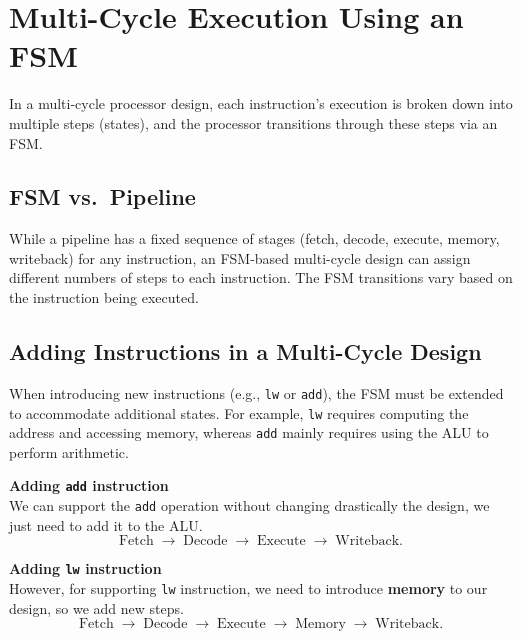 \section{Multi-Cycle Execution Using an FSM}
In a multi-cycle processor design, each instruction's execution is broken down into multiple steps (states), and the processor transitions through these steps via an FSM.

\subsection{FSM vs.\ Pipeline}
While a pipeline has a fixed sequence of stages (fetch, decode, execute, memory, writeback) for any instruction, an FSM-based multi-cycle design can assign different numbers of steps to each instruction. The FSM transitions vary based on the instruction being executed.



\subsection{Adding Instructions in a Multi-Cycle Design}
When introducing new instructions (e.g., \texttt{lw} or \texttt{add}), the FSM must be extended to accommodate additional states. For example, \texttt{lw} requires computing the address and accessing memory, whereas \texttt{add} mainly requires using the ALU to perform arithmetic. \\
\begin{minipage}[t]{0.45\textwidth}
\textbf{Adding \texttt{add} instruction}\\
We can support the \texttt{add} operation without changing drastically the design, we just need to add it to the ALU.
\[
\text{Fetch} \; \rightarrow \; \text{Decode} \; \rightarrow \; \text{Execute} \; \rightarrow \; \text{Writeback}.
\]
\end{minipage}
\hfill
\vline
\hfill
\begin{minipage}[t]{0.45\textwidth}
\textbf{Adding \texttt{lw} instruction}\\
However, for supporting \texttt{lw} instruction, we need to introduce \textbf{memory} to our design, so we add new steps.
\[
\text{Fetch} \; \rightarrow \; \text{Decode} \; \rightarrow \; \text{Execute} \; \rightarrow \; \text{Memory} \; \rightarrow \; \text{Writeback}.
\]
\end{minipage}
\newpage

